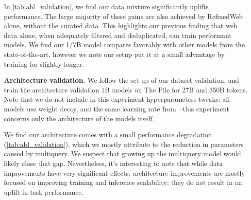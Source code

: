\documentclass{article}
\begin{document}
In \cref{tab:abl_validation}, we find our data mixture significantly uplifts performance. The large majority of these gains are also achieved by RefinedWeb alone, without the curated data. This highlights our previous finding that web data alone, when adequately filtered and deduplicated, can train performant models. We find our 1/7B model compares favorably with other models from the state-of-the-art, however we note our setup put it at a small advantage by training for slightly longer.

\textbf{Architecture validation.} We follow the set-up of our dataset validation, and train the architecture validation 1B models on The Pile for 27B and 350B tokens. Note that we do not include in this experiment hyperparameters tweaks: all models use weight decay, and the same learning rate from~\citet{brown2020gpt3}--this experiment concerns only the architecture of the models itself. 

We find our architecture comes with a small performance degradation (\cref{tab:abl_validation}), which we mostly attribute to the reduction in parameters caused by multiquery. We suspect that growing up the multiquery model would likely close that gap. Nevertheless, it's interesting to note that while data improvements have very significant effects, architecture improvements are mostly focused on improving training and inference scalability; they do not result in an uplift in task performance.
\end{document}

